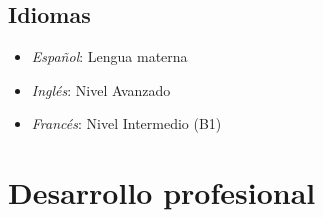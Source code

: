 \documentclass[letterpaper,10pt]{article}
\begin{document}
\subsection*{Idiomas}


    \begin{multicols}{2}


\begin{itemize}[label=$\blacktriangleright$]
\item \emph{Espa\~{n}ol}: Lengua materna
\item \emph{Ingl\'es}: Nivel Avanzado
\item \emph{Franc\'es}: Nivel Intermedio (B1)
\end{itemize}

\end{multicols}


\section*{Desarrollo profesional}
\end{document}

